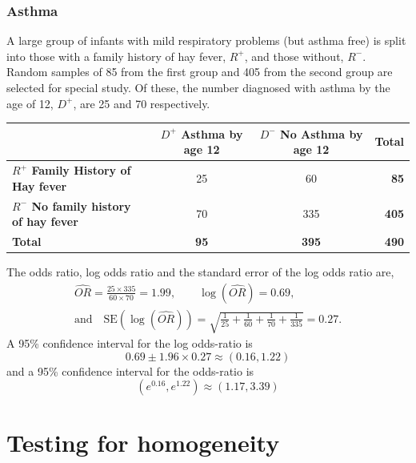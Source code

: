 \documentclass[a4paper]{article}
\begin{document}
\subsubsection{Asthma}
A large group of infants with mild respiratory problems (but asthma free) is split into those with a family history of hay fever, \textcolor{myred}{\( R^+ \)}, and those without, \textcolor{myred}{\( R^- \)}. Random samples of 85 from the first group and 405 from the second group are selected for special study. Of these, the number diagnosed with asthma by the age of 12, \textcolor{mygreen}{\( D^+ \)}, are 25 and 70 respectively.
\begin{table}[H]
	\centering
	\begin{tabular}{@{}lccr@{}}
	\toprule
				 														 & \textcolor{mygreen}{\textbf{\( D^+ \) Asthma by age 12}} & \textcolor{mygreen}{\textbf{\( D^- \) No Asthma by age 12}} & \textbf{Total}    \\ \midrule
	\textcolor{myred}{\textbf{\( R^+ \) Family History of Hay fever}}    & 25    		  											& 60        		                                          & \textcolor{myred}{\textbf{85}}  \\
	\textcolor{myred}{\textbf{\( R^- \) No family history of hay fever}} & 70    		  											& 335       		                                          & \textcolor{myred}{\textbf{405}} \\ \midrule
	\textbf{Total} 													     & \textbf{95}    											& \textbf{395}                                                & \textbf{490} \\ \bottomrule
	\end{tabular}
\end{table}
The odds ratio, log odds ratio and the standard error of the log odds ratio are,
\begin{gather*}
	\widehat{OR} = \frac{25 \times 335}{60\times 70} = 1.99, \quad \quad \log(\widehat{OR}) = 0.69,\\
	\text{and}\quad\text{SE}(\log(\widehat{OR})) = \sqrt{\frac{1}{25} + \frac{1}{60} + \frac{1}{70} + \frac{1}{335}} = 0.27.
\end{gather*}
A 95\% confidence interval for the log odds-ratio is
\[
	0.69 \pm 1.96 \times 0.27 \approx (0.16,1.22)
\]
and a 95\% confidence interval for the odds-ratio is 
\[ 
	(e^{0.16},e^{1.22}) \approx (1.17,3.39) 
\]

\section{Testing for homogeneity}\label{sec:7}
\end{document}
